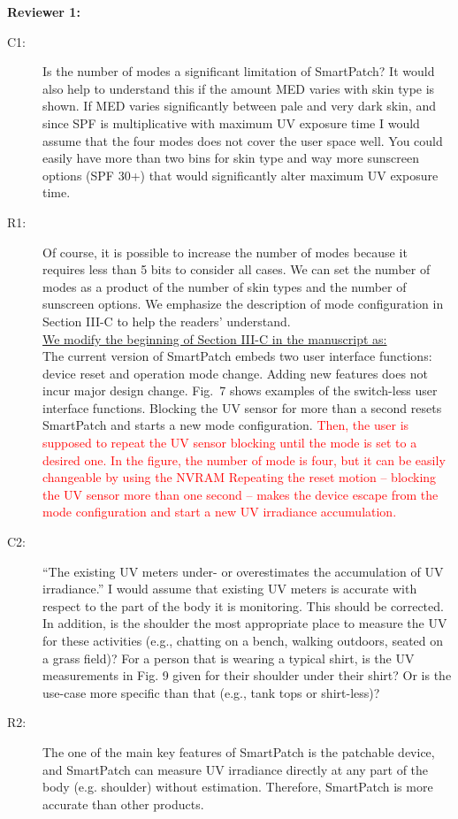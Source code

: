 \documentclass[onecolumn]{IEEEconf}
\begin{document}
\setlength{\parindent}{0cm}
\textbf{Reviewer 1:}
\begin{description}
\item [C1: ] Is the number of modes a significant limitation of SmartPatch? It would also help to understand this if the amount MED varies with skin type is shown. If MED varies significantly between pale and very dark skin, and since SPF is multiplicative with maximum UV exposure time I would assume that the four modes does not cover the user space well. You could easily have more than two bins for skin type and way more sunscreen options (SPF 30+) that would significantly alter maximum UV exposure time.  
\item [R1: ] Of course, it is possible to increase the number of modes because it requires less than 5 bits to consider all cases. We can set the number of modes as a product of the number of skin types and the number of sunscreen options. We emphasize the description of mode configuration in Section III-C to help the readers’ understand.\\

\underline{We modify the beginning of Section III-C in the manuscript as:}\\
The current version of SmartPatch embeds two user interface functions: device reset and operation mode change.
Adding new features does not incur major design change.
Fig.~7 shows examples of the switch-less user interface functions.
Blocking the UV sensor for more than a second resets SmartPatch and starts a new mode configuration.
\textcolor{red}{Then, the user is supposed to repeat the UV sensor blocking until the mode is set to a desired one. In the figure, the number of mode is four, but it can be easily changeable by using the NVRAM
Repeating the reset motion -- blocking the UV sensor more than one second -- makes the device escape from the mode configuration and start a new UV irradiance accumulation.}~\\

\item [C2: ] “The existing UV meters under- or overestimates the accumulation of UV irradiance.” I would assume that existing UV meters is accurate with respect to the part of the body it is monitoring. This should be corrected. In addition, is the shoulder the most appropriate place to measure the UV for these activities (e.g., chatting on a bench, walking outdoors, seated on a grass field)? For a person that is wearing a typical shirt, is the UV measurements in Fig. 9 given for their shoulder under their shirt? Or is the use-case more specific than that (e.g., tank tops or shirt-less)?
\item [R2: ] The one of the main key features of SmartPatch is the patchable device, and SmartPatch can measure UV irradiance directly at any part of the body (e.g. shoulder) without estimation. Therefore, SmartPatch is more accurate than other products.


\end{description}
\end{document}
